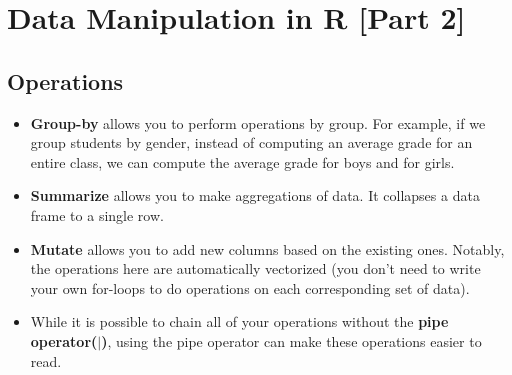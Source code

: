 
\section{Data Manipulation in R [Part 2]}
\subsection{Operations}
\begin{itemize}
\item \textbf{Group-by} allows you to perform operations by group. For example, if we group students by gender, instead of computing an average grade for an entire class, we can compute the average grade for boys and for girls. 
\item \textbf{Summarize} allows you to make aggregations of data. It collapses a data frame to a single row. 
\item \textbf{Mutate} allows you to add new columns based on the existing ones. Notably, the operations here are automatically vectorized (you don't need to write your own for-loops to do operations on each corresponding set of data).
\item While it is possible to chain all of your operations without the \textbf{pipe operator($|$)}, using the pipe operator can make these operations easier to read. 
\end{itemize}

